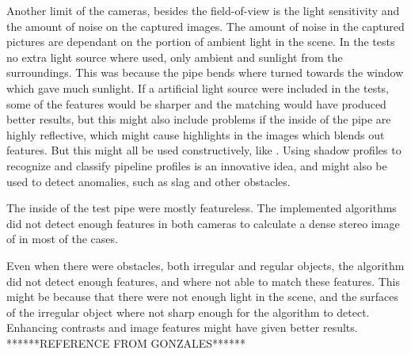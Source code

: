 Another limit of the cameras, besides the field-of-view is the light sensitivity and
the amount of noise on the captured images. The amount of noise in the captured pictures
are dependant on the portion of ambient light in the scene. In the tests no extra
light source where used, only ambient and sunlight from the surroundings. This was because
the pipe bends where turned towards the window which gave much sunlight. If a artificial
light source were included in the tests, some of the features would be sharper and the
matching would have produced better results, but this might also include problems if the
inside of the pipe are highly reflective, which might cause highlights in the images which
blends out features. But this might all be used constructively, like \cite{MRINSPECT-V}.
Using shadow profiles to recognize and classify pipeline profiles is an innovative idea,
and might also be used to detect anomalies, such as slag and other obstacles. 

The inside of the test pipe were mostly featureless. The implemented algorithms did not
detect enough features in both cameras to calculate a dense stereo image of in most of the
cases. 

Even when there were obstacles, both irregular and regular objects, the algorithm did not
detect enough features, and where not able to match these features. This might be because
that there were not enough light in the scene, and the surfaces of the irregular object
where not sharp enough for the algorithm to detect. Enhancing contrasts and image features
might have given better results. \cite{gonzalez} ******REFERENCE FROM GONZALES******

